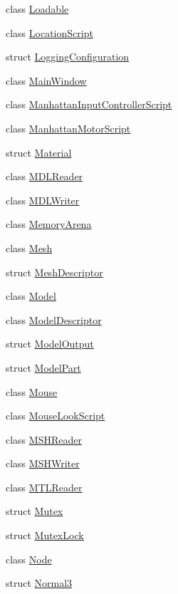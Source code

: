 \begin{DoxyCompactItemize}
class \hyperlink{classmage_1_1_loadable}{Loadable}
\item 
class \hyperlink{classmage_1_1_location_script}{Location\+Script}
\item 
struct \hyperlink{structmage_1_1_logging_configuration}{Logging\+Configuration}
\item 
class \hyperlink{classmage_1_1_main_window}{Main\+Window}
\item 
class \hyperlink{classmage_1_1_manhattan_input_controller_script}{Manhattan\+Input\+Controller\+Script}
\item 
class \hyperlink{classmage_1_1_manhattan_motor_script}{Manhattan\+Motor\+Script}
\item 
struct \hyperlink{structmage_1_1_material}{Material}
\item 
class \hyperlink{classmage_1_1_m_d_l_reader}{M\+D\+L\+Reader}
\item 
class \hyperlink{classmage_1_1_m_d_l_writer}{M\+D\+L\+Writer}
\item 
class \hyperlink{classmage_1_1_memory_arena}{Memory\+Arena}
\item 
class \hyperlink{classmage_1_1_mesh}{Mesh}
\item 
struct \hyperlink{structmage_1_1_mesh_descriptor}{Mesh\+Descriptor}
\item 
class \hyperlink{classmage_1_1_model}{Model}
\item 
class \hyperlink{classmage_1_1_model_descriptor}{Model\+Descriptor}
\item 
struct \hyperlink{structmage_1_1_model_output}{Model\+Output}
\item 
struct \hyperlink{structmage_1_1_model_part}{Model\+Part}
\item 
class \hyperlink{classmage_1_1_mouse}{Mouse}
\item 
class \hyperlink{classmage_1_1_mouse_look_script}{Mouse\+Look\+Script}
\item 
class \hyperlink{classmage_1_1_m_s_h_reader}{M\+S\+H\+Reader}
\item 
class \hyperlink{classmage_1_1_m_s_h_writer}{M\+S\+H\+Writer}
\item 
class \hyperlink{classmage_1_1_m_t_l_reader}{M\+T\+L\+Reader}
\item 
struct \hyperlink{structmage_1_1_mutex}{Mutex}
\item 
struct \hyperlink{structmage_1_1_mutex_lock}{Mutex\+Lock}
\item 
class \hyperlink{classmage_1_1_node}{Node}
\item 
struct \hyperlink{structmage_1_1_normal3}{Normal3}

\end{DoxyCompactItemize}
